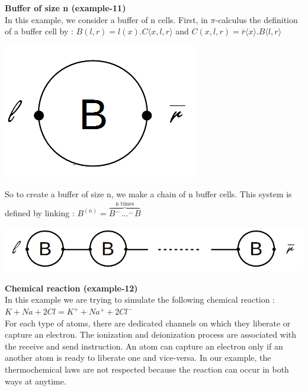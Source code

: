 \documentclass[11pt]{report}
\begin{document}
\vspace*{15pt}
\tabto{0cm} {\Large \textbf{Buffer of size n (example-11)}}
\vspace*{3pt}
\\
In this example, we consider a buffer of n cells. First, in $\pi$-calculus the definition of a buffer cell by :
$B(l,r) = l(x).C \langle x,l,r \rangle$ and $C(x,l,r) = \bar{r} \langle x \rangle .B \langle l,r \rangle$

\begin{center}
\includegraphics[scale = 0.25]{BufferCell.png}
\end{center}
So to create a buffer of size n, we make a chain of n buffer cells. This system is defined by linking :
$B^{(n)} = \overbrace{B^{ \frown} \ldots ^{\frown} B}^{\text{n times}}$

\begin{center}
\includegraphics[scale = 0.4]{Buffern.png}
\end{center}

\newpage

\tabto{0cm} {\Large \textbf{Chemical reaction (example-12)}}
\vspace*{3pt}
\\
In this example we are trying to simulate the following chemical reaction : \\
$K + Na + 2Cl = K^+ + Na^+ + 2Cl^-$ \\
For each type of atoms, there are dedicated channels on which they liberate or capture an electron. The ionization and deionization process are associated with the receive and send instruction. An atom can capture an electron only if an another atom is ready to liberate one and vice-versa. In our example, the thermochemical laws are not respected because the reaction can occur in both ways at anytime.  
\end{document}
